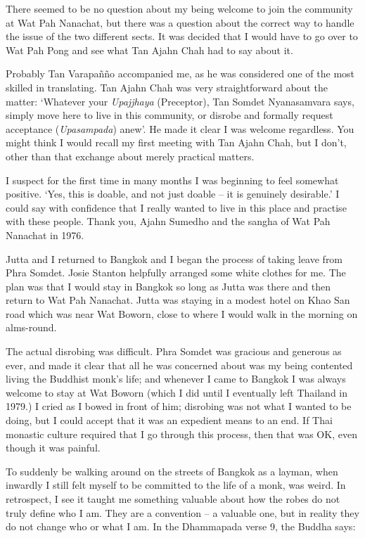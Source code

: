 There seemed to be no question about my being welcome to join the
community at Wat Pah Nanachat, but there was a question about the
correct way to handle the issue of the two different sects. It was
decided that I would have to go over to Wat Pah Pong and see what Tan
Ajahn Chah had to say about it.

Probably Tan Varapañño accompanied me, as he was considered one of the
most skilled in translating. Tan Ajahn Chah was very straightforward
about the matter: `Whatever your \emph{Upajjhaya} (Preceptor), Tan Somdet
Nyanasamvara says, simply move here to live in this community, or
disrobe and formally request acceptance (\emph{Upasampada}) anew'. He
made it clear I was welcome regardless. You might think I would recall
my first meeting with Tan Ajahn Chah, but I don't, other than that
exchange about merely practical matters.

I suspect for the first time in many months I was beginning to feel
somewhat positive. `Yes, this is doable, and not just doable -- it is
genuinely desirable.' I could say with confidence that I really wanted
to live in this place and practise with these people. Thank you, Ajahn
Sumedho and the sangha of Wat Pah Nanachat in 1976.

Jutta and I returned to Bangkok and I began the process of taking leave
from Phra Somdet. Josie Stanton helpfully arranged some
white clothes for me. The plan was that I would stay in Bangkok so long
as Jutta was there and then return to Wat Pah Nanachat. Jutta was
staying in a modest hotel on Khao San road which was near Wat Boworn,
close to where I would walk in the morning on alms-round.

The actual disrobing was difficult. Phra Somdet was gracious and
generous as ever, and made it clear that all he was concerned about was
my being contented living the Buddhist monk's life; and whenever I came
to Bangkok I was always welcome to stay at Wat Boworn (which I did until
I eventually left Thailand in 1979.) I cried as I bowed in front of him; disrobing
was not what I wanted to be doing, but I could accept that it was an
expedient means to an end. If Thai monastic culture required that I go
through this process, then that was OK, even though it was painful.

To suddenly be walking around on the streets of Bangkok as a layman,
when inwardly I still felt myself to be committed to the life of a monk,
was weird. In retrospect, I see it taught me something valuable about
how the robes do not truly define who I am. They are a convention -- a
valuable one, but in reality they do not change who or what I am. In the
Dhammapada verse 9, the Buddha says:

